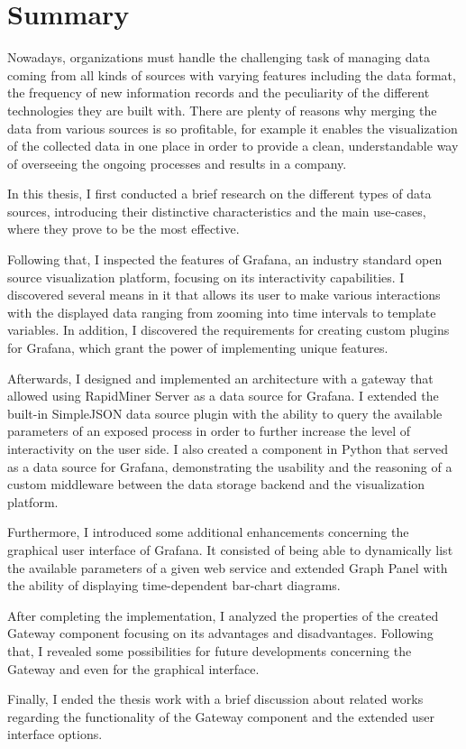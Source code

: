 \chapter{Summary}

Nowadays, organizations must handle the challenging task of managing data coming from all kinds of sources with varying features including the data format, the frequency of new information records and the peculiarity of the different technologies they are built with. There are plenty of reasons why merging the data from various sources is so profitable, for example it enables the visualization of the collected data in one place in order to provide a clean, understandable way of overseeing the ongoing processes and results in a company.

In this thesis, I first conducted a brief research on the different types of data sources, introducing their distinctive characteristics and the main use-cases, where they prove to be the most effective.

Following that, I inspected the features of Grafana, an industry standard open source visualization platform, focusing on its interactivity capabilities. I discovered several means in it that allows its user to make various interactions with the displayed data ranging from zooming into time intervals to template variables. In addition, I discovered the requirements for creating custom plugins for Grafana, which grant the power of implementing unique features.

Afterwards, I designed and implemented an architecture with a gateway that allowed using RapidMiner Server as a data source for Grafana. I extended the built-in SimpleJSON data source plugin with the ability to query the available parameters of an exposed process in order to further increase the level of interactivity on the user side. I also created a component in Python that served as a data source for Grafana, demonstrating the usability and the reasoning of a custom middleware between the data storage backend and the visualization platform.

Furthermore, I introduced some additional enhancements concerning the graphical user interface of Grafana. It consisted of being able to dynamically list the available parameters of a given web service and extended Graph Panel with the ability of displaying time-dependent bar-chart diagrams.

After completing the implementation, I analyzed the properties of the created Gateway component focusing on its advantages and disadvantages. Following that, I revealed some possibilities for future developments concerning the Gateway and even for the graphical interface.

Finally, I ended the thesis work with a brief discussion about related works regarding the functionality of the Gateway component and the extended user interface options.


